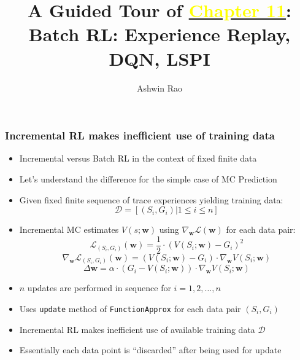 \documentclass{beamer}
\title[Batch RL Chapter]{A Guided Tour of \href{http://stanford.edu/~ashlearn/RLForFinanceBook/book.pdf}{\underline{\textcolor{yellow}{Chapter 11}}}: \\ Batch RL: Experience Replay, DQN, LSPI} %
\author{Ashwin Rao} %
\institute[Stanford] %
{ICME, Stanford University
}
\date %
\begin{document}
\lstset{language=Python}  
\begin{frame}
\titlepage %
\end{frame}


\begin{frame}
\frametitle{Incremental RL makes inefficient use of training data}
\begin{itemize}[<+->]
\item Incremental versus Batch RL in the context of fixed finite data
\item Let's understand the difference for the simple case of MC Prediction
\item Given fixed finite sequence of trace experiences yielding training data:
$$\mathcal{D} = [(S_i, G_i) | 1 \leq i \leq n]$$
\item Incremental MC estimates $V(s;\bm{w})$ using $\nabla_{\bm{w}} \mathcal{L}(\bm{w})$ for each data pair:
$$\mathcal{L}_{(S_i, G_i)}(\bm{w}) = \frac 1 2 \cdot (V(S_i; \bm{w}) - G_i)^2$$
$$\nabla_{\bm{w}} \mathcal{L}_{(S_i, G_i)}(\bm{w}) = (V(S_i; \bm{w}) - G_i) \cdot \nabla_{\bm{w}} V(S_i; \bm{w})$$
$$\Delta \bm{w} = \alpha \cdot (G_i - V(S_i; \bm{w})) \cdot \nabla_{\bm{w}} V(S_i; \bm{w})$$
\item $n$ updates are performed in sequence for $i = 1, 2, \ldots ,n$
\item Uses  \lstinline{update} method of \lstinline{FunctionApprox} for each data pair $(S_i, G_i)$
\item Incremental RL makes inefficient use of available training data $\mathcal{D}$
\item Essentially each data point is ``discarded'' after being used for update
\end{itemize}
\end{frame}
\end{document}
